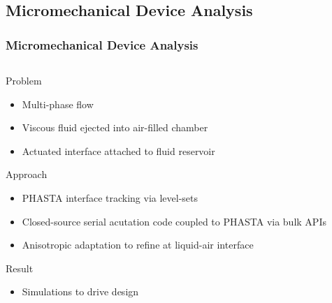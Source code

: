 \documentclass{beamer}
\begin{document}
\subsection{Micromechanical Device Analysis}
\begin{frame}
  \frametitle{Micromechanical Device Analysis}
  \begin{columns}
    \begin{column}{0.5\textwidth}
      Problem
      \begin{itemize}
        \item Multi-phase flow
        \item Viscous fluid ejected into air-filled chamber
        \item Actuated interface attached to fluid reservoir
      \end{itemize}
      Approach
      \begin{itemize}
        \item PHASTA interface tracking via level-sets
        \item Closed-source serial acutation code coupled to PHASTA via bulk
          APIs
        \item Anisotropic adaptation to refine at liquid-air interface
      \end{itemize}
      Result
      \begin{itemize}
        \item Simulations to drive design
      \end{itemize}
    \end{column}
    \begin{column}{0.5\textwidth}


\end{column}
\end{columns}
\end{frame}
\end{document}
